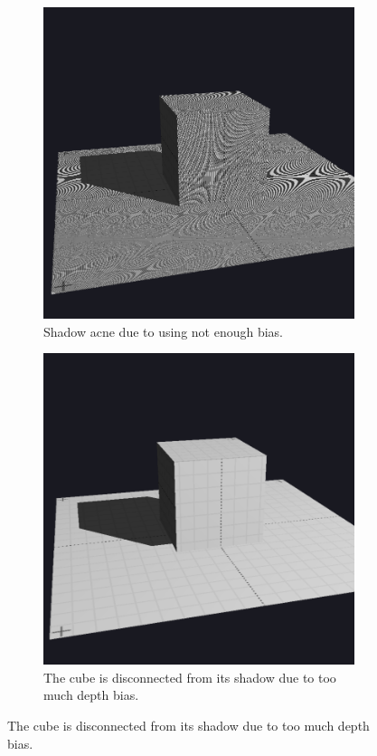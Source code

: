 \begin{figure}[h]
    \centering
    \begin{subfigure}{0.45\textwidth}
		\centering
        \includegraphics[width=\textwidth]{./graf/shadow_mapping_acne.png}
        \caption{Shadow acne due to using not enough bias.}
        \label{fig:shadow_mapping_acne}
    \end{subfigure}
	\hfill
    \begin{subfigure}{0.45\textwidth}
		\centering
        \includegraphics[width=\textwidth]{./graf/shadow_mapping_panning.png}
        \caption{The cube is disconnected from its shadow due to too much depth bias.}
        \label{fig:shadow_mapping_panning}
    \end{subfigure}


\end{figure}

